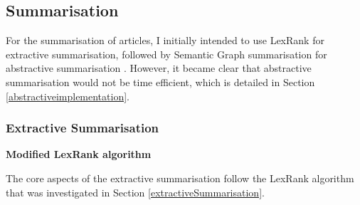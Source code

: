 \documentclass[12pt]{article}
\begin{document}
\subsection{Summarisation}

For the summarisation of articles, I initially intended to use LexRank \cite{lexRank} for extractive summarisation, followed by Semantic Graph summarisation for abstractive summarisation \cite{abstractiveTechniques}. However, it became clear that abstractive summarisation would not be time efficient, which is detailed in Section \ref{abstractiveimplementation}.

\subsubsection{Extractive Summarisation}

\label{extractiveimplementation}

\textbf{Modified LexRank algorithm}

The core aspects of the extractive summarisation follow the LexRank \cite{lexRank} algorithm that was investigated in Section \ref{extractiveSummarisation}. 
\end{document}

